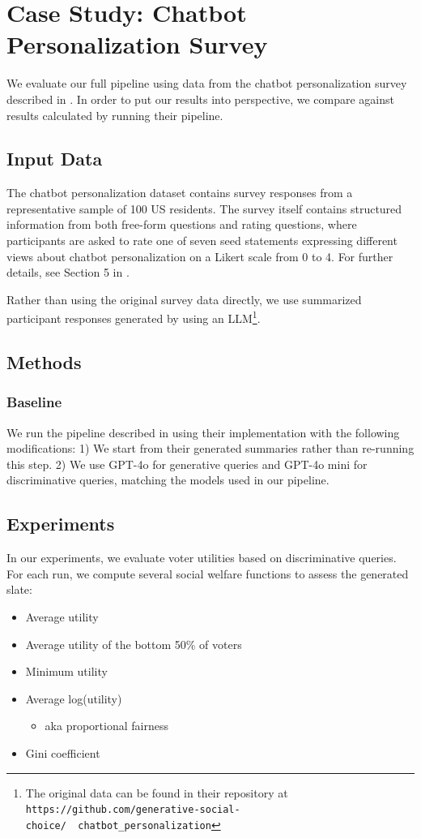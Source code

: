 \documentclass[11pt]{article}
\begin{document}
\section{Case Study: Chatbot Personalization Survey}

We evaluate our full pipeline using data from the chatbot personalization survey described in \citet{fish-v2}. In order to put our results into perspective, we compare against results calculated by running their pipeline.
 \subsection{Input Data}
The chatbot personalization dataset contains survey responses from a representative sample of 100 US residents. The survey itself contains structured information from both free-form questions and rating questions, where participants are asked to rate one of seven seed statements expressing different views about chatbot personalization on a Likert scale from 0 to 4. For further details, see Section 5 in \citet{fish-v2}.

Rather than using the original survey data directly, we use summarized participant responses generated by \citet{fish-v2} using an LLM\footnote{The original data can be found in their repository at \texttt{https://github.com/generative-social-choice/\
\
chatbot\_personalization}}.

\subsection{Methods}
\subsubsection{Baseline}
We run the pipeline described in \citet{fish-v2} using their implementation with the following modifications: 1) We start from their generated summaries rather than re-running this step. 2) We use GPT-4o for generative queries and GPT-4o mini for discriminative queries, matching the models used in our pipeline.

\subsection{Experiments} \label{sec:chatbot-experiments}
In our experiments, we evaluate voter utilities based on discriminative queries. For each run, we compute several social welfare functions to assess the generated slate:
\begin{itemize}
    \item Average utility
    \item Average utility of the bottom 50\% of voters
    \item Minimum utility
    \item Average log(utility)
    \begin{itemize}
        \item aka proportional fairness
    \end{itemize}
    \item Gini coefficient
\end{itemize}
\end{document}
